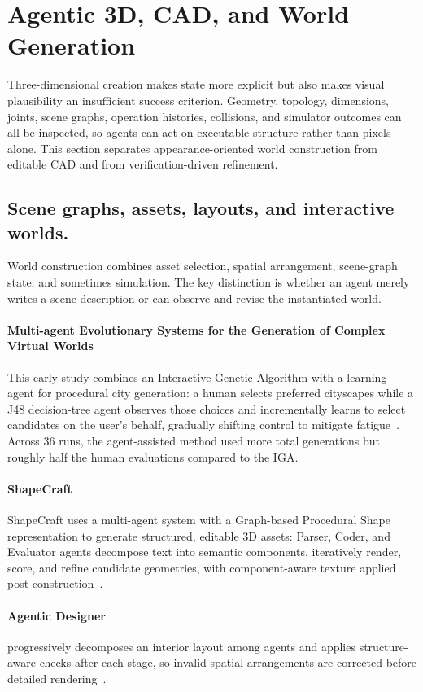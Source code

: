 \section{Agentic 3D, CAD, and World Generation}
\label{sec:3d-cad-world}

Three-dimensional creation makes state more explicit but also makes visual plausibility an insufficient success criterion. Geometry, topology, dimensions, joints, scene graphs, operation histories, collisions, and simulator outcomes can all be inspected, so agents can act on executable structure rather than pixels alone. This section separates appearance-oriented world construction from editable CAD and from verification-driven refinement.

\subsection{Scene graphs, assets, layouts, and interactive worlds.}
World construction combines asset selection, spatial arrangement, scene-graph state, and sometimes simulation. The key distinction is whether an agent merely writes a scene description or can observe and revise the instantiated world.

\paragraph{Multi-agent Evolutionary Systems for the Generation of Complex Virtual Worlds}
This early study combines an Interactive Genetic Algorithm with a learning agent for procedural city generation: a human selects preferred cityscapes while a J48 decision-tree agent observes those choices and incrementally learns to select candidates on the user's behalf, gradually shifting control to mitigate fatigue~\cite{avg160405792}. Across 36 runs, the agent-assisted method used more total generations but roughly half the human evaluations compared to the IGA. 

\paragraph{ShapeCraft}
ShapeCraft uses a multi-agent system with a Graph-based Procedural Shape representation to generate structured, editable 3D assets: Parser, Coder, and Evaluator agents decompose text into semantic components, iteratively render, score, and refine candidate geometries, with component-aware texture applied post-construction~\cite{avg251017603}. 

\paragraph{Agentic Designer} progressively decomposes an interior layout among agents and applies structure-aware checks after each stage, so invalid spatial arrangements are corrected before detailed rendering~\cite{avg260720866}.

